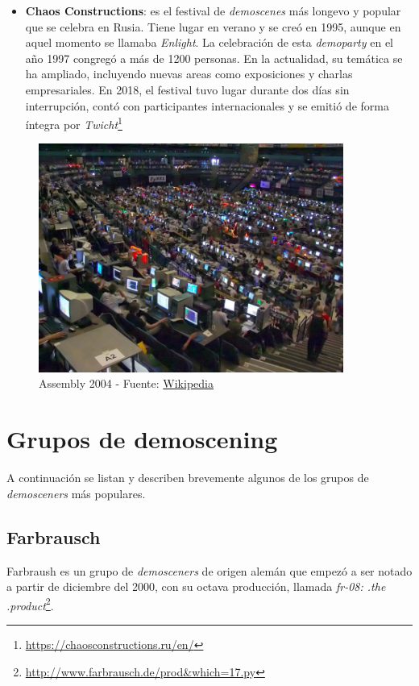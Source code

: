 \begin{itemize}
	\item \textbf{Chaos Constructions}: es el festival de \emph{demoscenes} más longevo y popular que se celebra en Rusia. Tiene lugar en verano y se creó en 1995, aunque en aquel momento se llamaba \emph{Enlight}. La celebración de esta \emph{demoparty} en el año 1997 congregó a más de 1200 personas. En la actualidad, su temática se ha ampliado, incluyendo nuevas areas como exposiciones y charlas empresariales. En 2018, el festival tuvo lugar durante dos días sin interrupción, contó con participantes internacionales y se emitió de forma íntegra por \emph{Twicht}\footnote{\url{https://chaosconstructions.ru/en/}}
\end{itemize}

\begin{figure}[h]
	\centering
	\includegraphics[width=10cm]{archivos/Assembly2004}
	\caption{Assembly 2004 - Fuente: \href{https://en.wikipedia.org/wiki/Demoscene\#/media/File:Assembly2004-areena01.jpg}{Wikipedia}}
	\label{fig:assembly}
\end{figure}

\section{Grupos de demoscening}

A continuación se listan y describen brevemente algunos de los grupos de \emph{demosceners} más populares.

\subsection{Farbrausch}

Farbraush es un grupo de \emph{demosceners} de origen alemán que empezó a ser notado a partir de diciembre del 2000, con su octava producción, llamada \emph{fr-08: .the .product}\footnote{\url{http://www.farbrausch.de/prod&which=17.py}}.\\

